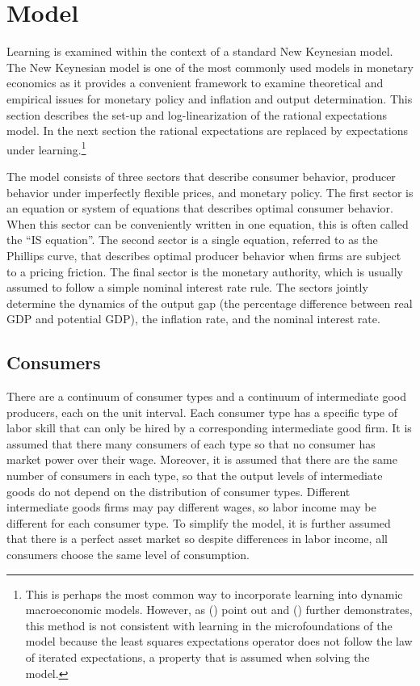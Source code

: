 \documentclass[11pt]{article}
\newcommand{\citee}[1]{\citeauthor*{#1} (\citeyear{#1})}
\begin{document}
\section{Model}
Learning is examined within the context of a standard New Keynesian model.  The New Keynesian model is one of the most commonly used models in monetary economics as it provides a convenient framework to examine theoretical and empirical issues for monetary policy and inflation and output determination.  This section describes the set-up and log-linearization of the rational expectations model. In the next section the rational expectations are replaced by expectations under learning.\footnote{This is perhaps the most common way to incorporate learning into dynamic macroeconomic models.  However, as \citee{marcetsargent1989} point out and \citee{preston2005} further demonstrates, this method is not consistent with learning in the microfoundations of the model because the least squares expectations operator does not follow the law of iterated expectations, a property that is assumed when solving the model.}

The model consists of three sectors that describe consumer behavior, producer behavior under imperfectly flexible prices, and monetary policy.  The first sector is an equation or system of equations that describes optimal consumer behavior.  When this sector can be conveniently written in one equation, this is often called the ``IS equation''.  The second sector is a single equation, referred to as the Phillips curve, that describes optimal producer behavior when firms are subject to a pricing friction.  The final sector is the monetary authority, which is usually assumed to follow a simple nominal interest rate rule.  The sectors jointly determine the dynamics of the output gap (the percentage difference between real GDP and potential GDP), the inflation rate, and the nominal interest rate.  

\subsection{Consumers}
There are a continuum of consumer types and a continuum of intermediate good producers, each on the unit interval.  Each consumer type has a specific type of labor skill that can only be hired by a corresponding intermediate good firm.  It is assumed that there many consumers of each type so that no consumer has market power over their wage.  Moreover, it is assumed that there are the same number of consumers in each type, so that the output levels of intermediate goods do not depend on the distribution of consumer types.  Different intermediate goods firms may pay different wages, so labor income may be different for each consumer type.  To simplify the model, it is further assumed that there is a perfect asset market so despite differences in labor income, all consumers choose the same level of consumption.
\end{document}
